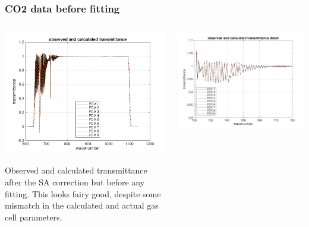 \documentclass[10pt]{beamer}
\begin{document}
\begin{frame}
\frametitle{CO2 data before fitting}
\begin{columns}[t]
\begin{column}{0.5\textwidth}  
  \begin{centering}
  \includegraphics[width=\textwidth]{figures/spec_test2_CO2_all.png}
  \end{centering}\vspace{3mm}

Observed and calculated transmittance after the SA correction but
before any fitting.  This looks fairy good, despite some mismatch
in the calculated and actual gas cell parameters.

\end{column}

\begin{column}{0.5\textwidth}
  \begin{centering}
  \includegraphics[width=\textwidth]{figures/spec_test2_CO2_zoom.png}
  \end{centering}\vspace{3mm}


\end{column}
\end{columns}
\end{frame}
\end{document}
